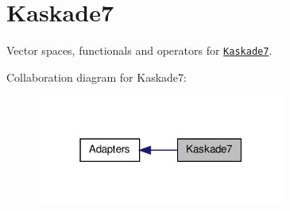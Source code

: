 \hypertarget{group__KaskadeGroup}{\section{\-Kaskade7}
\label{group__KaskadeGroup}
}


\-Vector spaces, functionals and operators for \href{http://www.zib.de/projects/kaskade7-finite-element-toolbox}{\tt \-Kaskade7}.  


\-Collaboration diagram for \-Kaskade7\-:
\nopagebreak
\begin{figure}[H]
\begin{center}
\leavevmode
\includegraphics[width=232pt]{group__KaskadeGroup}
\end{center}
\end{figure}
